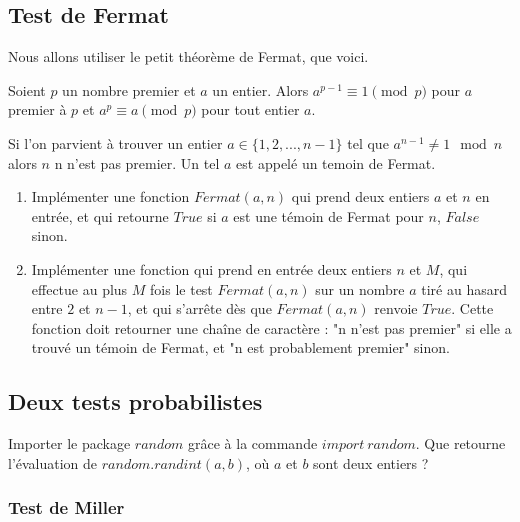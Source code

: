 \subsection{Test de Fermat}

Nous allons utiliser le petit théorème de Fermat, que voici.
\begin{thm}
Soient $p$ un nombre premier et $a$ un entier. Alors $a^{p-1} \equiv 1\pmod p$ pour $a$ premier à $p$ et $a^p\equiv a \pmod p$ pour tout entier $a$.
\end{thm}

Si l'on parvient à trouver un entier $a\in \{1,2,...,n-1\}$ tel que $a^{n-1}\neq 1\mod n$ alors $n$ n n'est pas premier. Un tel $a$ est appelé un temoin de Fermat.
\begin{enumerate}
\item Implémenter une fonction $Fermat(a,n)$ qui prend deux entiers $a$ et $n$ en entrée, et qui retourne $True$ si $a$ est une témoin de Fermat pour $n$, $False$ sinon.
\item Implémenter une fonction qui prend en entrée deux entiers $n$ et $M$, qui effectue au plus $M$ fois le test $Fermat(a,n)$ sur un nombre $a$ tiré au hasard entre $2$ et $n-1$, et qui s'arrête dès que $Fermat(a,n)$ renvoie $True$. Cette fonction doit retourner une chaîne de caractère : "n n'est pas premier" si elle a trouvé un témoin de Fermat, et "n est probablement premier" sinon.
\end{enumerate}

\subsection{Deux tests probabilistes}

Importer le package $random$ grâce à la commande $import \ random$. Que retourne l'évaluation de $random.randint(a,b)$, où $a$ et $b$ sont deux entiers ?

\subsubsection{Test de Miller}

